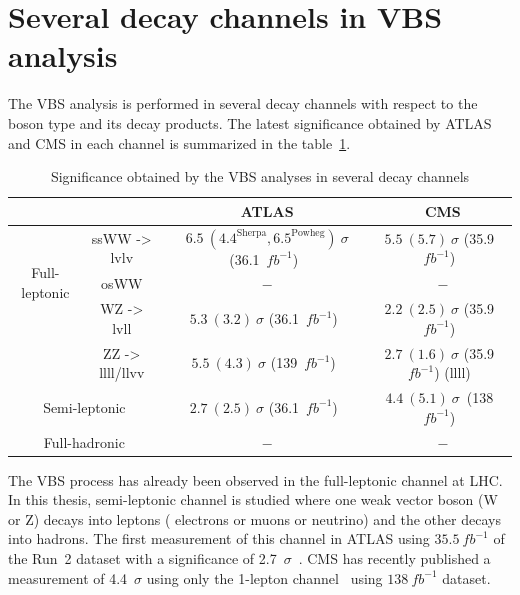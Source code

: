 \section{Several decay channels in VBS analysis}
The VBS analysis is performed in several decay channels with respect to the boson type and its decay products.
The latest significance obtained by ATLAS and CMS in each channel is summarized in the table~\ref{tab:VBSchannels}.

\begin{center}
\begin{table}[h]
\begin{tabular}{|c|c|c|c|}
\hline \multicolumn{2}{|c|}{}                                   & ATLAS                              & CMS\\
\hline
\hline \multirow{3}{*}{ Full-leptonic }      & ssWW -> lvlv     & $6.5~(4.4^{\mathrm{Sherpa}}, 6.5^{\mathrm{Powheg}})~\sigma$ (36.1~$fb^{-1}$)~\cite{STDM-2017-06} & $5.5~(5.7)~\sigma$ (35.9~$fb^{-1}$)~\cite{CMS-SMP-21-001}  \\
\cline { 2 - 4 }                             & osWW             & $-$                                 & $-$   \\
\cline { 2 - 4 }                             & WZ -> lvll       & $5.3~(3.2)~\sigma$ (36.1~$fb^{-1}$)~\cite{STDM-2017-23} & $2.2~(2.5)~\sigma$ (35.9~$fb^{-1}$)~\cite{CMS-SMP-18-001}   \\
\cline { 2 - 4 }                             & ZZ -> llll/llvv  & $5.5~(4.3)~\sigma$ (139~$fb^{-1}$)~\cite{STDM-2017-19}  & $2.7~(1.6)~\sigma$ (35.9~$fb^{-1}$) (llll)~\cite{CMS-SMP-17-006} \\
\hline \multicolumn{2}{|c|}{ Semi-leptonic }                    & $2.7~(2.5)~\sigma$ (36.1~$fb^{-1}$)~\cite{STDM-2017-20} & $4.4~(5.1)~\sigma$~(138~$fb^{-1}$)~\cite{CMS-SMP-20-013}  \\
\hline \multicolumn{2}{|c|}{ Full-hadronic }                    & $-$                                & $-$  \\
\hline
\end{tabular}
\caption{Significance obtained by the VBS analyses in several decay channels}
\label{tab:VBSchannels}
\end{table}
\end{center}
The VBS process has already been observed in the full-leptonic channel at LHC.
In this thesis, semi-leptonic channel is studied where one weak vector boson (W or Z) decays into leptons ( electrons or muons or neutrino) and the other decays into hadrons.
The first measurement of this channel in ATLAS using $35.5~fb^{-1}$ of the Run~2 dataset with a significance of 2.7~$\sigma$~\cite{STDM-2017-20}. 
CMS has recently published a measurement of 4.4~$\sigma$ using only the 1-lepton channel~\cite{CMS-SMP-20-013} using  $138~fb^{-1}$ dataset.

